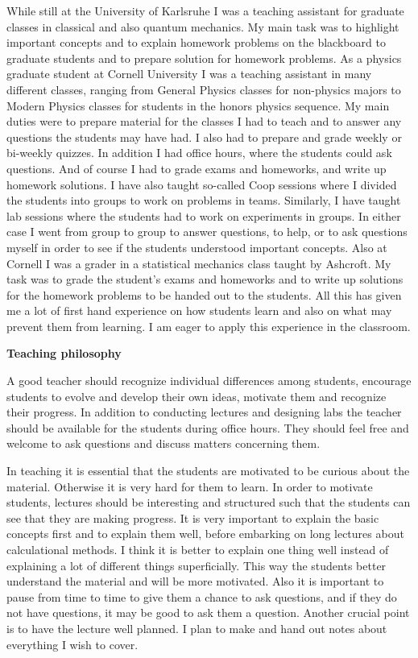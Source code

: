 \documentclass[11pt]{article}
\begin{document}
\begin{spacing}{0.95}
While still at the University of Karlsruhe I was a teaching assistant for
graduate classes in classical and also quantum mechanics. My main task was
to highlight important concepts and to explain homework problems on the
blackboard to graduate students and to prepare solution for homework
problems. As a physics graduate student at Cornell University I was a
teaching assistant in many different classes, ranging from General Physics
classes for non-physics majors to Modern Physics classes for students in the
honors physics sequence. My main duties were to prepare material for the
classes I had to teach and to answer any questions the students may have
had. I also had to prepare and grade weekly or bi-weekly quizzes. In
addition I had office hours, where the students could ask questions. And of
course I had to grade exams and homeworks, and write up homework
solutions. I have also taught so-called Coop sessions where I divided the
students into groups to work on problems in teams. Similarly, I have taught
lab sessions where the students had to work on experiments in groups. In
either case I went from group to group to answer questions, to help, or to
ask questions myself in order to see if the students understood important
concepts. Also at Cornell I was a grader in a statistical mechanics class
taught by Ashcroft. My task was to grade the student's exams and homeworks
and to write up solutions for the homework problems to be handed out to the
students. All this has given me a lot of first hand experience on how
students learn and also on what may prevent them from learning. I am eager
to apply this experience in the classroom.


\medskip
\noindent
{\bf Teaching philosophy}
\smallskip

A good teacher should recognize individual differences among students,
encourage students to evolve and develop their own ideas, motivate them and
recognize their progress. In addition to conducting lectures
and designing labs the teacher should be available for the students during
office hours. They should feel free and welcome to ask questions and discuss
matters concerning them.

In teaching it is essential that the students are motivated to
be curious about the material. Otherwise it is very hard for them to learn.
In order to motivate students, lectures should be interesting
and structured such that the students can see that they are making progress.
It is very important to explain the basic concepts first and to explain them
well, before embarking on long lectures about calculational methods.
I think it is better to explain one thing well instead of explaining a lot
of different things superficially. 
This way the students better understand the material and
will be more motivated. Also it is important to pause from time to time to
give them a chance to ask questions, and if they do not have questions,
it may be good to ask them a question.
Another crucial point is to have the lecture well planned. I plan to make
and hand out notes about everything I wish to cover.


\end{spacing}
\end{document}
